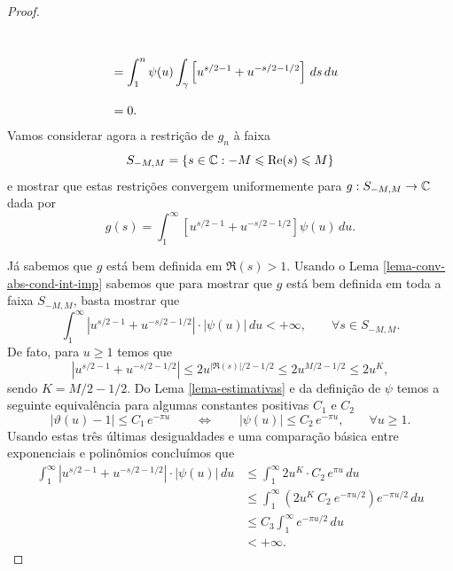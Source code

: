 \begin{proof}
\begin{align*}
            \\[0.3cm]
            &= \int_1^n \psi(u) \int_{\gamma} \left[ u^{s/2 - 1} + u^{-s/2 - 1/2} \right] \, ds \, du 
            \\[0.3cm]
            &= 0.
        \end{align*}
        Vamos considerar agora a restrição de $g_n$ à faixa
        \[
        S_{-M, M} = \{ s\in\mathbb{C} : -M \leqslant \mathrm{Re}(s)\leqslant M \}
        \]
        e mostrar que estas restrições 
        convergem uniformemente para $
        g:S_{-M, M}\to\mathbb{C}$ dada por
        \[
        g(s) 
        = 
        \int_1^{\infty} 
        \left[ 
        u^{s/2 - 1} + u^{-s/2 - 1/2} 
        \right] 
        \psi(u) \, du.
        \]
        
        
        Já sabemos que $g$ está bem definida em $\Re(s) > 1$. Usando o Lema \ref{lema-conv-abs-cond-int-imp}
        sabemos que para mostrar que $g$ está bem
        definida em toda a faixa $S_{-M, M}$, basta mostrar que
        \[
        \int_1^{\infty} \left| u^{s/2 - 1} + u^{-s/2 - 1/2} \right|\cdot|\psi(u)| \, du < +\infty,
        \qquad \forall s\in S_{-M, M}.
        \]
        De fato, para $u\geq 1$ temos que
        \[
        |u^{s/2 - 1} + u^{-s/2 - 1/2}| \leq 2u^{|\Re(s)|/2 - 1/2} \leq 2u^{M/2 - 1/2} \leq 2u^K,
        \]
        sendo $K = M/2 - 1/2$. 
        Do Lema \ref{lema-estimativas}
        e da definição de $\psi$ temos a seguinte 
        equivalência para algumas constantes positivas
        $C_1$ e $C_2$
        \[
        |\vartheta(u) - 1| 
        \leq 
        C_1\, e^{-\pi u} 
        \qquad\iff\qquad 
        |\psi(u)| 
        \leq 
        C_2\, e^{-\pi u},
        \qquad \forall u\geqslant 1.
        \]
        Usando estas três últimas desigualdades e uma comparação básica entre exponenciais e polinômios 
        concluímos que
        \begin{align*}
        \int_1^{\infty} 
        \left| u^{s/2 - 1} + u^{-s/2 - 1/2} \right|\cdot|\psi(u)| 
        \, du
        &\leqslant
        \int_1^{\infty} 2u^{K}\cdot C_2\, e^{\pi u} \, du
        \\
        &\leq 
        \int_1^{\infty} \left( 2u^K\ C_2\ 
        e^{-\pi u/2} \right)e^{-\pi u/2}\, du 
        \\
        &\leq 
        C_3\int_1^{\infty} e^{-\pi u/2} \, du \\
        &< +\infty.
        \end{align*}

\end{proof}
